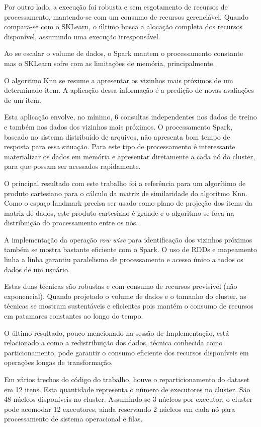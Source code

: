 \documentclass[12pt]{article}
\begin{document}
Por outro lado, a execução foi robusta e sem esgotamento de recursos de processamento, mantendo-se com um consumo de recursos gerenciável. Quando compara-se com o SKLearn, o último busca a alocação completa dos recursos disponível, assumindo uma execução irresponsável. 

Ao se escalar o volume de dados, o Spark mantem o processamento constante mas o SKLearn sofre com as limitações de memória, principalmente.

O algoritmo Knn se resume a apresentar os vizinhos mais próximos de um determinado item. A aplicação dessa informação é a predição de novas avaliações de um item. 

Esta aplicação envolve, no mínimo, 6 consultas independentes nos dados de treino e também nos dados dos vizinhos mais próximos. O processamento Spark, baseado no sistema distribuído de arquivos, não apresenta bom tempo de resposta para essa situação. Para este tipo de processamento é interessante materializar os dados em memória e apresentar diretamente a cada nó do cluster, para que possam ser acessados rapidamente.

O principal resultado com este trabalho foi a referência para um algorítimo de produto cartesiano para o cálculo da matriz de similaridade do algoritmo Knn. Como o espaço landmark precisa ser usado como plano de projeção dos items da matriz de dados, este produto cartesiano é grande e o algoritmo se foca na distribuição do processamento entre os nós.

A implementação da operação \textit{row wise} para identificação dos vizinhos próximos também se mostra bastante eficiente com o Spark. O uso de RDDs e mapeamento linha a linha garantiu paralelismo de processamento e acesso único a todos os dados de um usuário.

Estas duas técnicas são robustas e com consumo de recursos previsível (não exponencial). Quando projetado o volume de dados e o tamanho do cluster, as técnicas se mostram sustentáveis e eficientes pois mantém o consumo de recursos em patamares constantes ao longo do tempo.

O último resultado, pouco mencionado na sessão de Implementação, está relacionado a como a redistribuição dos dados, técnica conhecida como particionamento, pode garantir o consumo eficiente dos recursos disponíveis em operações longas de transformação. 

Em vários trechos do código do trabalho, houve o reparticionamento do dataset em 12 itens. Esta quantidade representa o número de executores no cluster. São 48 núcleos disponíveis no cluster. Assumindo-se 3 núcleos por executor, o cluster pode acomodar 12 executores, ainda reservando 2 núcleos em cada nó para processamento de sistema operacional e filas.
\end{document}
